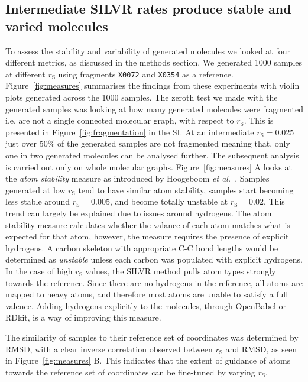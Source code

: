 \documentclass[journal=jacsat,manuscript=article]{achemso}
\begin{document}
\subsection{Intermediate SILVR rates produce stable and varied molecules}
To assess the stability and variability of generated molecules we looked at four different metrics, as discussed in the methods section. We generated 1000 samples at different $r_{\mathrm{S}}$ using fragments \texttt{X0072} and \texttt{X0354} as a reference. Figure~\ref{fig:measures} summarises the findings from these experiments with violin plots generated across the 1000 samples. The zeroth test we made with the generated samples was looking at how many generated molecules were fragmented i.e. are not a single connected molecular graph, with respect to $r_{\mathrm{S}}$. This is presented in Figure~\ref{fig:fragmentation} in the SI. At an intermediate $r_{\mathrm{S}} = 0.025$ just over 50\% of the generated samples are not fragmented meaning that, only one in two generated molecules can be analysed further. The subsequent analysis is carried out only on whole molecular graphs. 
Figure~\ref{fig:measures} A looks at the \textit{atom stability} measure as introduced by Hoogeboom \textit{et al.}~\cite{hoogeboom2022equivariant}. Samples generated at low $r_{\mathrm{S}}$ tend to have similar atom stability, samples start becoming less stable around $r_{\mathrm{S}}=0.005$, and become totally unstable at $r_{\mathrm{S}}=0.02$. This trend can largely be explained due to issues around hydrogens. The atom stability measure calculates whether the valance of each atom matches what is expected for that atom, however, the measure requires the presence of explicit hydrogens. A carbon skeleton with appropriate C-C bond lengths would be determined as \textit{unstable} unless each carbon was populated with explicit hydrogens. In the case of high $r_{\mathrm{S}}$ values, the SILVR method pulls atom types strongly towards the reference. Since there are no hydrogens in the reference, all atoms are mapped to heavy atoms, and therefore most atoms are unable to satisfy a full valence. Adding hydrogens explicitly to the molecules, through OpenBabel or RDkit, is a way of improving this measure. 


The similarity of samples to their reference set of coordinates was determined by RMSD, with a clear inverse correlation observed between $r_{\mathrm{S}}$ and RMSD, as seen in Figure~\ref{fig:measures} B. This indicates that the extent of guidance of atoms towards the reference set of coordinates can be fine-tuned by varying $r_{\mathrm{S}}$. 
\end{document}
